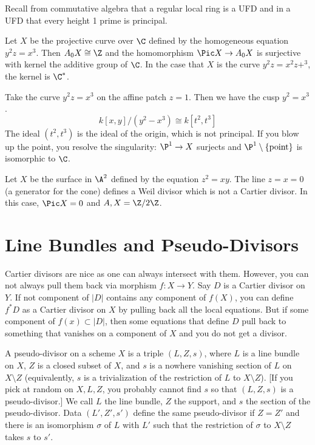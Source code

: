 Recall from commutative algebra that a regular local ring is a UFD and in a UFD that every height 1 prime is principal. 


\begin{ex}
Let $X$ be the projective curve over $\C$ defined by the homogeneous equation $y^2z=x^3$. Then $A_0X \cong \Z$ and the homomorphism $\Pic X \to A_0X$ is surjective with kernel the additive group of $\C$. In the case that $X$ is the curve $y^2z=x^2z+^3$, the kernel is $\C^*$.
\end{ex}


\begin{ex}
Take the curve $y^2z=x^3$ on the affine patch $z=1$. Then we have the cusp $y^2=x^3$. 
	\[
	k[x,y]/(y^2-x^3) \cong k[t^2,t^3]
	\]
The ideal $(t^2,t^3)$ is the ideal of the origin, which is not principal. If you blow up the point, you resolve the singularity: $\P^1 \to X$ surjects and $\P^1 \setminus \{\text{point}\}$ is isomorphic to $\C$. 
\end{ex}


\begin{ex}
Let $X$ be the surface in $\A^2$ defined by the equation $z^2=xy$. The line $z=x=0$ (a generator for the cone) defines a Weil divisor which is not a Cartier divisor. In this case, $\Pic X=0$ and $A,X= \Z/2\Z$. 
\end{ex}





\section{Line Bundles and Pseudo-Divisors}


Cartier divisors are nice as one can always intersect with them. However, you can not always pull them back via morphism $f: X \to Y$. Say $D$ is a Cartier divisor on $Y$. If not component of $|D|$ contains any component of $f(X)$, you can define $f^*D$ as a Cartier divisor on $X$ by pulling back all the local equations. But if some component of $f(x) \subset |D|$, then some equations that define $D$ pull back to something that vanishes on a component of $X$ and you do not get a divisor. 


\begin{dfn}
A pseudo-divisor on a scheme $X$ is a triple $(L,Z,s)$, where $L$ is a line bundle on $X$, $Z$ is a closed subset of $X$, and $s$ is a nowhere vanishing section of $L$ on $X\setminus Z$ (equivalently, $s$ is a trivialization of the restriction of $L$ to $X \setminus Z$). [If you pick at random on $X, L, Z$, you probably cannot find $s$ so that $(L,Z,s)$ is a pseudo-divisor.] We call $L$ the line bundle, $Z$ the support, and $s$ the section of the pseudo-divisor. Data $(L',Z',s')$ define the same pseudo-divisor if $Z=Z'$ and there is an isomorphism $\sigma$ of $L$ with $L'$ such that the restriction of $\sigma$ to $X \setminus Z$ takes $s$ to $s'$. 
\end{dfn}


